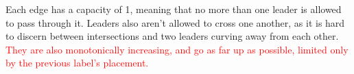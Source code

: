 \documentclass[11pt,a4paper]{vutinfth}
\newcommand{\change}[1]{\textcolor{red}{#1}}
\begin{document}
Each edge has a capacity of 1, meaning that no more than one leader is allowed to pass through it. Leaders also aren't allowed to cross one another, as it is hard to discern between intersections and two leaders curving away from each other. \change{They are also monotonically increasing, and go as far up as possible, limited only by the previous label's placement.} %



\end{document}
